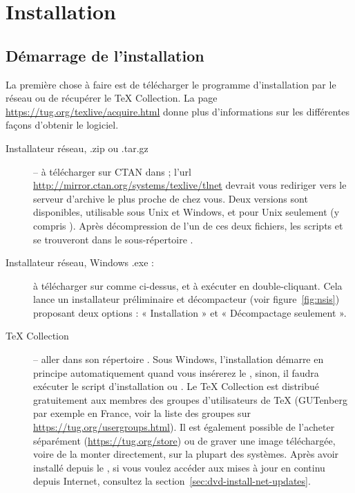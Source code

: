 \documentclass[german, english, french]{article}
\renewcommand{\TK}{\TeX{} Collection\xspace}%
\begin{document}
\section{Installation}
\label{sec:install}

\subsection{Démarrage de l'installation}
\label{sec:inst_start}

La première chose à faire est de télécharger le programme d'installation par le
réseau ou de récupérer le \DVD{} \TK.  La page
\url{https://tug.org/texlive/acquire.html} donne plus d'informations sur les
différentes façons d'obtenir le logiciel.

\begin{description}
\item[Installateur réseau, .zip ou .tar.gz] -- à télécharger sur CTAN dans
   ; l'url
  \url{http://mirror.ctan.org/systems/texlive/tlnet} devrait vous rediriger vers
  le serveur d'archive le plus proche de chez vous.  Deux versions sont
  disponibles,  utilisable sous Unix et Windows, et
   pour Unix seulement (y compris \MacOSX). Après
  décompression de l'un de ces deux fichiers, les scripts 
  et  se trouveront dans le sous-répertoire
  .

\item[Installateur réseau, Windows .exe :] à télécharger sur \CTAN{} comme
  ci-dessus, et à exécuter en double-cliquant. Cela lance un installateur
  préliminaire et décompacteur (voir figure~\ref{fig:nsis}) proposant deux
  options : « Installation » et « Décompactage seulement ».

\item[\DVD \TK{}] -- aller dans son répertoire .  Sous Windows,
  l'installation démarre en principe automatiquement quand vous insérerez le
  \DVD, sinon, il faudra exécuter le script d'installation 
  ou .  Le \DVD \TK{} est distribué gratuitement aux
  membres des groupes d'utilisateurs de \TeX{} (GUTenberg par exemple en France,
  voir la liste des groupes sur \url{https://tug.org/usergroups.html}). Il est
  également possible de l'acheter séparément (\url{https://tug.org/store}) ou de
  graver une image \ISO{} téléchargée, voire de la monter directement, sur la
  plupart des systèmes.  Après avoir installé depuis le \DVD{}, si vous voulez
  accéder aux mises à jour en continu depuis Internet, consultez la
  section~\ref{sec:dvd-install-net-updates}.
\end{description}
\end{document}
